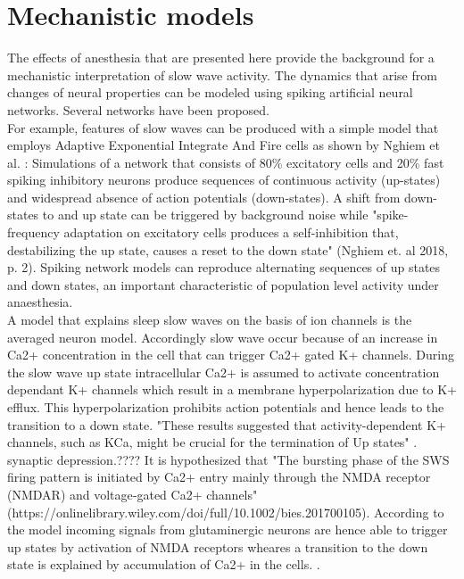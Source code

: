\section{Mechanistic models}
\label{mechanistic_models}
The effects of anesthesia that are presented here provide the background for a mechanistic interpretation of slow wave activity. The dynamics that arise from changes of neural properties can be modeled using spiking artificial neural networks. Several networks have been proposed.\\
For example, features of slow waves can be produced with a simple model that employs Adaptive Exponential Integrate And Fire cells as shown by Nghiem et al. \parencite{nghiem2018two}: Simulations of a network that consists of 80\% excitatory cells and 20\% fast spiking inhibitory neurons produce sequences of continuous activity (up-states) and widespread absence of action potentials (down-states). A shift from down-states to and up state can be triggered by background noise while "spike-frequency adaptation on excitatory cells produces a self-inhibition that, destabilizing the up state, causes a reset to the down state" (Nghiem et. al 2018, p. 2). Spiking network models can reproduce alternating sequences of up states and down states, an important characteristic of population level activity under anaesthesia. \\
A model that explains sleep slow waves on the basis of ion channels is the averaged neuron model. Accordingly slow wave occur because of an increase in Ca2+ concentration in the cell that can trigger Ca2+ gated K+ channels. During the slow wave up state intracellular Ca2+ is assumed to activate concentration dependant K+ channels which result in a membrane hyperpolarization due to K+ efflux. This hyperpolarization prohibits action potentials and hence leads to the transition to a down state. "These results suggested that activity-dependent K+ channels, such as KCa, might be crucial for the termination of Up states" \parencite{neske2016slow}. synaptic depression.???? It is hypothesized that "The bursting phase of the SWS firing pattern is initiated by Ca2+ entry mainly through the NMDA receptor (NMDAR) and voltage‐gated Ca2+ channels" (https://onlinelibrary.wiley.com/doi/full/10.1002/bies.201700105). According to the model incoming signals from glutaminergic neurons are hence able to trigger up states by activation of NMDA receptors wheares a transition to the down state is explained by accumulation of Ca2+ in the cells. \parencite{shi2019genes}.\\
